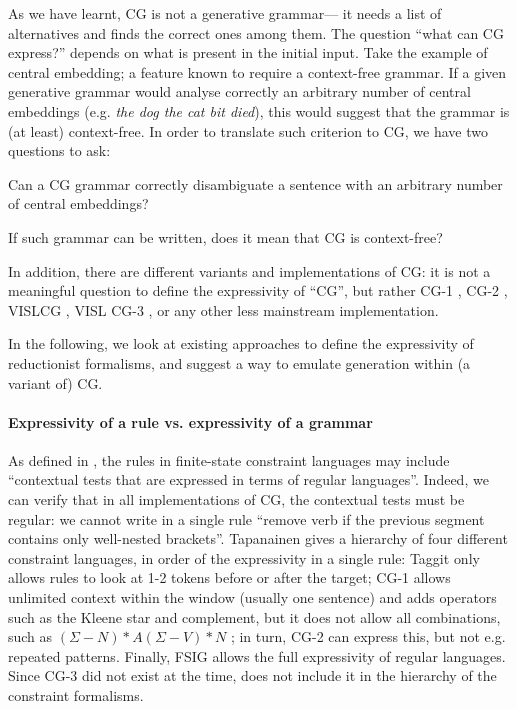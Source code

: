 As we have learnt, CG is not a generative grammar---
it needs a list of alternatives and finds the correct ones among them.
The question ``what can CG express?'' depends on what is present in the initial input. 
Take the example of central embedding; a feature known to require a context-free grammar. If a given generative grammar would analyse correctly an arbitrary number of central embeddings (e.g. \emph{the dog \emph{the cat bit} died}), this would suggest that the grammar is (at least) context-free. In order to translate such criterion to CG, we have two questions to ask: 
\begin{inparaenum}
\item Can a CG grammar correctly disambiguate a sentence with an arbitrary number of central embeddings?
\item If such grammar can be written, does it mean that CG is context-free?
\end{inparaenum}
In addition, there are different variants and implementations of CG: 
it is not a meaningful question to define the expressivity of ``CG'', but rather CG-1 \cite{karlsson1995constraint}, CG-2 \cite{tapanainen1996}, VISLCG , VISL CG-3 \cite{bick2015}, or any other less mainstream implementation.

In the following, we look at existing approaches to define the expressivity of reductionist formalisms, 
and suggest a way to emulate generation within (a variant of) CG.



\paragraph{Expressivity of a rule vs. expressivity of a grammar}

As defined in \cite{tapanainen1999phd}, the rules in finite-state constraint languages may include ``contextual tests that are expressed in terms of regular languages''. 
Indeed, we can verify that in all implementations of CG, 
the contextual tests must be regular: we cannot write in a single rule ``remove verb if the previous segment contains only well-nested brackets''.
Tapanainen gives a hierarchy of four different constraint languages, in order of the expressivity in a single rule: Taggit \cite{taggit} only allows rules to look at 1-2 tokens before or after the target; CG-1 \cite{karlsson1990cgp} allows unlimited context within the window (usually one sentence) and adds operators such as the Kleene star and complement, but it does not allow all combinations, such as $(\Sigma - N)*A(\Sigma - V)*N$ ; in turn, CG-2 \cite{tapanainen1996} can express this, but not e.g. repeated patterns. Finally, FSIG \cite{koskenniemi90} allows the full expressivity of regular languages. Since CG-3 \cite{bick2015} did not exist at the time, \cite{tapanainen1996} does not include it in the hierarchy of the constraint formalisms.

